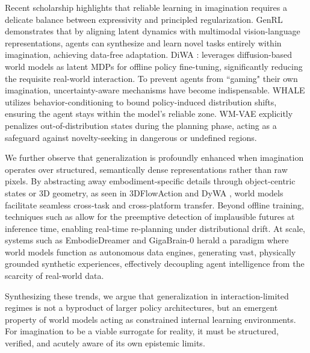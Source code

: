 \documentclass[pdflatex,sn-mathphys-num]{sn-jnl}
\theoremstyle{thmstyleone}%
\theoremstyle{thmstyletwo}%
\theoremstyle{thmstylethree}%
\begin{document}
Recent scholarship highlights that reliable learning in imagination requires a delicate balance between expressivity and principled regularization. GenRL \citep{genrl} demonstrates that by aligning latent dynamics with multimodal vision-language representations, agents can synthesize and learn novel tasks entirely within imagination, achieving data-free adaptation. DiWA \citep{diwa}: leverages diffusion-based world models as latent MDPs for offline policy fine-tuning, significantly reducing the requisite real-world interaction. To prevent agents from ``gaming" their own imagination, uncertainty-aware mechanisms have become indispensable. WHALE \citep{whale} utilizes behavior-conditioning to bound policy-induced distribution shifts, ensuring the agent stays within the model's reliable zone. WM-VAE \citep{wmvae} explicitly penalizes out-of-distribution states during the planning phase, acting as a safeguard against novelty-seeking in dangerous or undefined regions.

We further observe that generalization is profoundly enhanced when imagination operates over structured, semantically dense representations rather than raw pixels. By abstracting away embodiment-specific details through object-centric states or 3D geometry, as seen in 3DFlowAction \citep{flow} and DyWA \citep{dywa}, world models facilitate seamless cross-task and cross-platform transfer. %
Beyond offline training, techniques such as \citep{lps, reoi} allow for the preemptive detection of implausible futures at inference time, enabling real-time re-planning under distributional drift. At scale, systems such as EmbodieDreamer \citep{embodiedreamer} and GigaBrain-0 \citep{gigabrain} herald a paradigm where world models function as autonomous data engines, generating vast, physically grounded synthetic experiences, effectively decoupling agent intelligence from the scarcity of real-world data.

Synthesizing these trends, we argue that generalization in interaction-limited regimes is not a byproduct of larger policy architectures, but an emergent property of world models acting as constrained internal learning environments. For imagination to be a viable surrogate for reality, it must be structured, verified, and acutely aware of its own epistemic limits.
\end{document}
